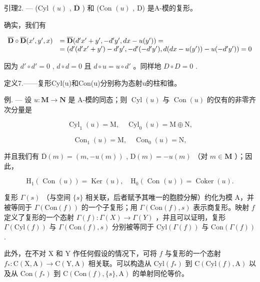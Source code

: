 引理2. --- (Cyl \((u)\) , \(\overline{\mathbf{D}}\) ) 和 (Con \((u)\) , D) 是A-模的复形。

确实，我们有

\[
\begin{array}{r l} \overline {{\mathbf {D}}} \circ \overline {{\mathbf {D}}} (x ^ {\prime}, y ^ {\prime}, x) & = \overline {{\mathbf {D}}} (d ^ {\prime} x ^ {\prime} + y ^ {\prime}, - d ^ {\prime} y ^ {\prime}, d x - u (y ^ {\prime})) = \\ & = (d ^ {\prime} (d ^ {\prime} x ^ {\prime} + y ^ {\prime}) - d ^ {\prime} y ^ {\prime}, - d ^ {\prime} (- d ^ {\prime} y ^ {\prime}), d (d x - u (y ^ {\prime})) - u (- d ^ {\prime} y ^ {\prime})) = 0 \end{array}
\]

因为 \(d' \circ d' = 0\) , \(d \circ d = 0\) 且 \(d \circ u = u \circ d'\) 。同样地 \(D \circ D = 0\) .

定义7.——复形Cyl(u)和Con(u)分别称为态射u的柱和锥。

例. --- 设 \(u: \mathbf{M} \to \mathbf{N}\) 是 A-模的同态；则 \(\operatorname{Cyl}(u)\) 与 \(\operatorname{Con}(u)\) 的仅有的非零齐次分量是

\[
\operatorname{Cyl} _ {1} (u) = \mathrm{M}, \quad \operatorname{Cyl} _ {0} (u) = \mathrm{M} \oplus \mathrm{N},
\]

\[
\operatorname{Con} _ {1} (u) = \mathrm{M}, \quad \operatorname{Con} _ {0} (u) = \mathrm{N},
\]

并且我们有 \(\overline{\mathrm{D}}(m) = (m, -u(m))\) , \(\mathrm{D}(m) = -u(m)\) （对 \(m \in \mathbf{M}\) ）；因此，

\[
\mathrm{H} _ {1} (\text { Con } (u)) = \operatorname{Ker} (u), \quad \mathrm{H} _ {0} (\text { Con } (u)) = \operatorname{Coker} (u).
\]

复形 \(\Gamma(s)\) （与空间 \(\{s\}\) 相关联，后者赋予其唯一的胞腔分解）约化为模 A，并被等同于 \(\Gamma(\text{Con}(f))\) 的一个子复形；用 \(\Gamma(\text{Con}(f), s)\) 表示商复形。映射 \(f\) 定义了复形的一个态射 \(\Gamma(f): \Gamma(X) \to \Gamma(Y)\) ，并且可以证明，复形 \(\Gamma(\text{Cyl}(f))\) 与 \(\Gamma(\text{Con}(f), s)\) 分别被等同于 \(\text{Cyl}(\Gamma(f))\) 与 \(\text{Con}(\Gamma(f))\) .

此外，在不对 X 和 Y 作任何假设的情况下，可将 \(f\) 与复形的一个态射 \(f_{*}: \mathrm{C}(\mathrm{X}, \mathrm{A}) \to \mathrm{C}(\mathrm{Y}, \mathrm{A})\) 相关联。可以构造从 \(\mathrm{Cyl}(f_{*})\) 到 \(\mathrm{C}(\mathrm{Cyl}(f), \mathrm{A})\) 以及从 \(\mathrm{Con}(f_{*})\) 到 \(\mathrm{C}(\mathrm{Con}(f), \{s\}, \mathrm{A})\) 的单射同伦等价。

